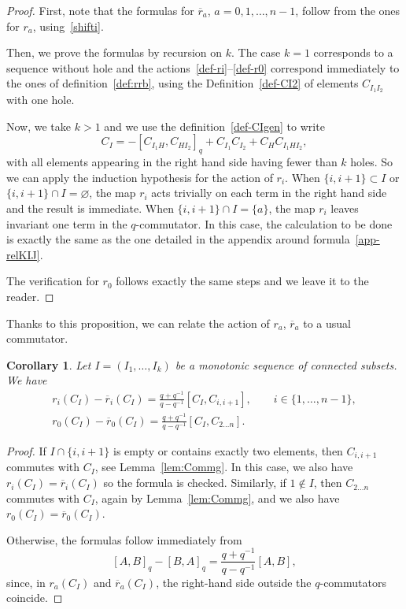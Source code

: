 \documentclass[pdftex]{sigma}
\numberwithin{equation}{section}
\newtheorem{coro}[theo]{Corollary}
\theoremstyle{definition}
\newcommand{\rb}{\overline{r}}
\begin{document}
\begin{proof}
First, note that the formulas for $\rb_a$, $a=0,1,\dots,n-1$, follow from the ones for $r_a$, using~\eqref{shifti}.

Then, we prove the formulas by recursion on $k$. The case $k=1$ corresponds to a sequence without hole and the actions~\eqref{def-ri}--\eqref{def-r0} correspond immediately to the ones of definition~\ref{def:rrb}, using the Definition~\eqref{def-CI2} of elements $C_{I_1I_2}$ with one hole.

Now, we take $k>1$ and we use the definition~\eqref{def-CIgen} to write
\[C_I=-[C_{I_1H},C_{HI_2}]_q+C_{I_1}C_{I_2}+C_H C_{I_1HI_2} ,\]
with all elements appearing in the right hand side having fewer than $k$ holes. So we can apply the induction hypothesis for the action of $r_i$. When $\{i,i+1\}\subset I$ or $\{i,i+1\}\cap I=\varnothing$, the map $r_i$ acts trivially on each term in the right hand side and the result is immediate. When $\{i,i+1\}\cap I=\{a\}$, the map $r_i$ leaves invariant one term in the $q$-commutator. In this case, the calculation to be done is exactly the same as the one detailed in the appendix around formula~\eqref{app-relKIJ}.

The verification for $r_0$ follows exactly the same steps and we leave it to the reader.
\end{proof}

Thanks to this proposition, we can relate the action of $r_a$, $\rb_a$ to a usual commutator.
\begin{coro}%
Let $I=(I_1,\dots,I_k)$ be a monotonic sequence of connected subsets. We have
\begin{gather*}%
r_i(C_I)-\rb_i(C_I)=\displaystyle\frac{q+q^{-1}}{q-q^{-1}}[C_I,C_{i,i+1}] , \qquad i\in\{1,\dots,n-1\} ,\\
r_0(C_I)-\rb_0(C_I)=\displaystyle\frac{q+q^{-1}}{q-q^{-1}}[C_I,C_{2\dots n}] .
\end{gather*}
\end{coro}
\begin{proof}
If $I\cap\{i,i+1\}$ is empty or contains exactly two elements, then $C_{i,i+1}$ commutes with $C_I$, see Lemma~\ref{lem:Commg}. In this case, we also have $r_i(C_I)=\rb_i(C_I)$ so the formula is checked. Similarly, if $1\notin I$, then $C_{2\dots n}$ commutes with $C_I$, again by Lemma~\ref{lem:Commg}, and we also have $r_0(C_I)=\rb_0(C_I)$.

Otherwise, the formulas follow immediately from
\[ [A , B]_q -[B , A]_q=\frac{q+q^{-1}}{q-q^{-1}}[A , B] ,\]
since, in $r_a(C_I)$ and $\rb_a(C_I)$, the right-hand side outside the $q$-commutators coincide.
\end{proof}
\end{document}
